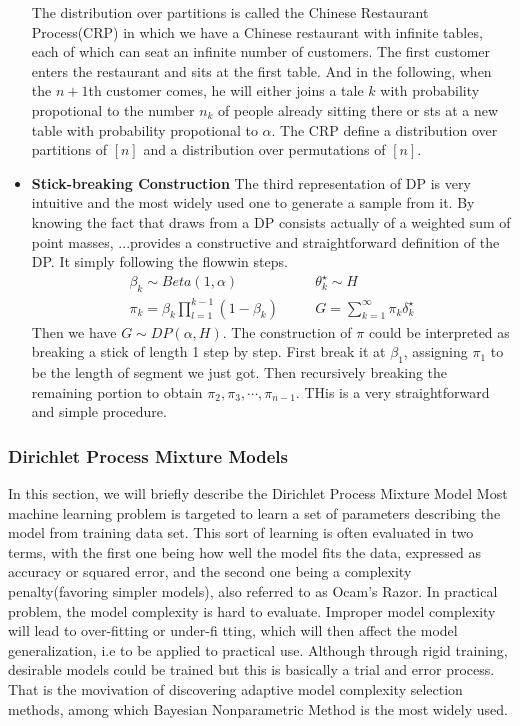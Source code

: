 \begin{itemize}
	The distribution over partitions is called the Chinese Restaurant Process(CRP) in which we have a Chinese restaurant with infinite tables, each of which can seat an infinite number of customers. The first customer enters the restaurant and sits at the first table. And in the following, when the $n+1$th customer comes, he will either joins a tale $k$ with probability propotional to the number $n_k$ of people already sitting there or sts at a new table with probability propotional to $\alpha$. The CRP define a distribution over partitions of $[n]$ and a distribution over permutations of $[n]$. 
	\item \textbf{Stick-breaking Construction} 
	The  third representation of DP is very intuitive and the most widely used one to generate a sample from it. By knowing the fact that draws from a DP consists actually of a weighted sum of point masses, ...provides a constructive and straightforward definition of the DP. It simply following the flowwin steps.
	\begin{eqnarray}
		\beta_k\sim Beta(1,\alpha)&\quad&\theta_k^\star\sim H\nonumber \\
		\pi_k=\beta_k\prod_{l=1}^{k-1}(1-\beta_k)&\quad&G=\sum_{k=1}^{\infty}\pi_k\delta_k^\star
	\end{eqnarray}
	Then we have $G\sim DP(\alpha,H)$. The construction of $\pi$ could be interpreted as breaking a stick of length 1 step by step. First break it at $\beta_1$, assigning $\pi_1$ to be the length of segment we just got. Then recursively breaking the remaining portion to obtain $\pi_2,\pi_3,\cdots,\pi_{n-1}$. THis is a very straightforward and simple procedure.
\end{itemize}   

\subsubsection{Dirichlet Process Mixture Models}\label{bnp}
In this section, we will briefly describe the Dirichlet Process Mixture Model
Most machine learning problem is targeted to learn a set of parameters describing the model from training data set. This sort of learning is often evaluated in two terms, with the first one being how well the model fits the data, expressed as accuracy or squared error, and the second one being a complexity penalty(favoring simpler models)\cite{gershma2012tutorial,escobar1995bayesian}, also referred to as Ocam's Razor. In practical problem, the model complexity is hard to evaluate. Improper model complexity will lead to over-fitting or under-fi tting\cite{gershman2012tutorial,muller2004nonparametric}, which will then affect the model generalization, i.e to be applied to practical use. Although through rigid training, desirable models could be trained but this is basically a trial and error process\cite{hjort2010bayesian}. That is the movivation of discovering adaptive model complexity selection methods, among which Bayesian Nonparametric Method is the most widely used.

